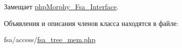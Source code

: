 Замещает \hyperlink{interfacephpMorphy__Fsa__Interface_a6e249e8e54705e4c1d9399ff0e491ce0}{phpMorphy\_\-Fsa\_\-Interface}.



Объявления и описания членов класса находятся в файле:\begin{DoxyCompactItemize}
\item 
fsa/access/\hyperlink{fsa__tree__mem_8php}{fsa\_\-tree\_\-mem.php}\end{DoxyCompactItemize}
